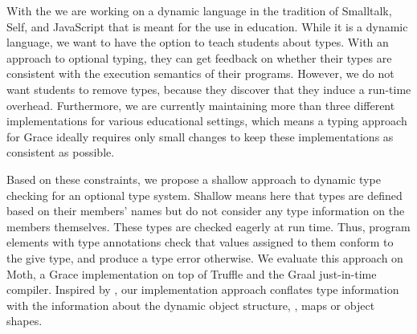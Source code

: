 
With the 
we are working on a dynamic language in the tradition of
Smalltalk\citep{Smalltalk80}, Self\citep{Self}, and JavaScript
that is meant for the use in education.
While it is a dynamic language,
we want to have the option to teach students about types.
With an approach to optional typing,
they can get feedback on whether their types are consistent
with the execution semantics of their programs.
However, we do not want students to remove types,
because they discover that they induce a run-time overhead.
Furthermore, we are currently maintaining more than three different implementations
for various educational settings,
which means a typing approach for Grace ideally requires only small changes
to keep these implementations as consistent as possible.

Based on these constraints,
we propose a shallow approach to dynamic type checking
for an optional type system.
Shallow means here that types are defined based on their members' names
but do not consider any type information on the members themselves.
These types are checked eagerly at run time.
Thus, program elements with type annotations check
that values assigned to them conform to the give type,
and produce a type error otherwise.
We evaluate this approach on Moth,
a Grace implementation on top of Truffle
and the Graal just-in-time compiler\citep{Wurthinger2013,Wurthinger:2017:PPE}.
Inspired by \citet{Richards2017,Bauman2017},
our implementation approach conflates type information
with the information about the dynamic object structure,
\ie, maps\citep{Self} or object shapes\citep{woss2014object}.



